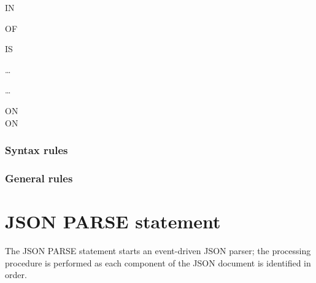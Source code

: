 \begin{syntax}[\miscextcolour]
    \identifier {} \identifier

  \begin{0-1}
     IN \identifier
  \end{0-1}

  \begin{0-1}
     OF
    \begin{1=}
      \identifier IS \literal
    \end{1=}\ldots
  \end{0-1}

  \begin{0-1}
    \begin{1=}
      \identifier
    \end{1=} \ldots
  \end{0-1}

  \begin{0+}
    ON  \imperativestatement \\
     ON  \imperativestatement
  \end{0+}

  \begin{0-1}
  \end{0-1}
\end{syntax}

\subsubsection{Syntax rules}

\subsubsection{General rules}

\section{JSON PARSE statement}

The JSON PARSE statement starts an event-driven JSON parser; the processing procedure is performed as each component of the JSON document is identified in order.

